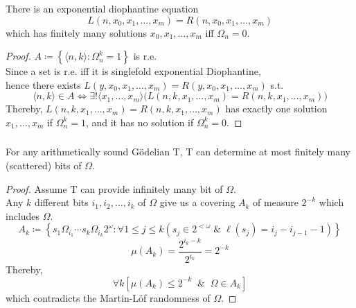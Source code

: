 \documentclass[UTF8,aspectratio=43,11pt,colorlinks,compress,openany]{beamer}%
\begin{document}
\begin{frame}\frametitle{}
	\begin{theorem}
		There is an exponential diophantine equation \[L(n,x_0,x_1,\ldots,x_m)=R(n,x_0,x_1,\ldots,x_m)\] which has finitely many solutions $x_0,x_1,\ldots,x_m$ iff $\Omega_n=0$.
	\end{theorem}
	\begin{proof}
		$A\coloneqq \left\{\langle n,k\rangle: \Omega^k_n=1\right\}$ is r.e.\\
		Since a set is r.e. iff it is singlefold exponential Diophantine,\\
		hence there exists $L(y,x_0,x_1,\ldots,x_m)=R(y,x_0,x_1,\ldots,x_m)$ s.t.
		\[\langle n,k\rangle\in A\iff \exists !\langle x_1,\ldots,x_m\rangle\big(L(n,k,x_1,\ldots,x_m)=R(n,k,x_1,\ldots,x_m)\big)\]
		Thereby, $L(n,k,x_1,\ldots,x_m)=R(n,k,x_1,\ldots,x_m)$ has exactly one solution $x_1,\ldots,x_m$ if $\Omega^k_n=1$, and it has no solution if $\Omega^k_n=0$.
	\end{proof}
\end{frame}

\begin{frame}\frametitle{}
	\begin{theorem}
		For any arithmetically sound G\"odelian $\mathrm{T}$, $\mathrm{T}$ can determine at most finitely many (scattered) bits of $\Omega$.
	\end{theorem}
	\begin{proof}
		Assume $\mathrm{T}$ can provide infinitely many bit of $\Omega$.\\
		Any $k$ different bits $i_1,i_2,\ldots,i_k$ of $\Omega$ give us a covering $A_k$ of measure $2^{-k}$ which includes $\Omega$.
		\[A_k\coloneqq \left\{s_1\Omega_{i_1}\cdots s_k\Omega_{i_k}2^\omega: \forall 1\leq j\leq k\left(s_j\in 2^{<\omega}\;\&\;\ell(s_j)=i_j-i_{j-1}-1\right)\right\}\]
		\[\mu(A_k)=\dfrac{2^{i_k-k}}{2^{i_k}}=2^{-k}\]
		Thereby, \[\forall k\left[\mu(A_k)\leq 2^{-k}\;\;\&\;\;\Omega\in A_k\right]\]
		which contradicts the Martin-L\"of randomness of $\Omega$.
	\end{proof}
\end{frame}
\end{document}
